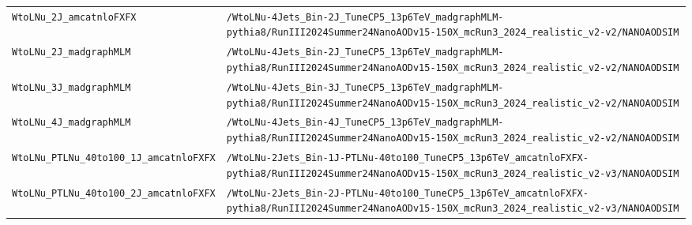 \begin{longtable}{@{}>{\RaggedRight\arraybackslash}p{} >{\RaggedRight\arraybackslash}p{}@{}}
\addlinespace[2pt]
\texttt{WtoLNu\_\allowbreak{}2J\_\allowbreak{}amcatnloFXFX} & \texttt{/\allowbreak{}WtoLNu-\allowbreak{}4Jets\_\allowbreak{}Bin-\allowbreak{}2J\_\allowbreak{}TuneCP5\_\allowbreak{}13p6TeV\_\allowbreak{}madgraphMLM-\allowbreak{}pythia8/\allowbreak{}RunIII2024Summer24NanoAODv15-\allowbreak{}150X\_\allowbreak{}mcRun3\_\allowbreak{}2024\_\allowbreak{}realistic\_\allowbreak{}v2-\allowbreak{}v2/\allowbreak{}NANOAODSIM} \\
\addlinespace[2pt]
\texttt{WtoLNu\_\allowbreak{}2J\_\allowbreak{}madgraphMLM} & \texttt{/\allowbreak{}WtoLNu-\allowbreak{}4Jets\_\allowbreak{}Bin-\allowbreak{}2J\_\allowbreak{}TuneCP5\_\allowbreak{}13p6TeV\_\allowbreak{}madgraphMLM-\allowbreak{}pythia8/\allowbreak{}RunIII2024Summer24NanoAODv15-\allowbreak{}150X\_\allowbreak{}mcRun3\_\allowbreak{}2024\_\allowbreak{}realistic\_\allowbreak{}v2-\allowbreak{}v2/\allowbreak{}NANOAODSIM} \\
\addlinespace[2pt]
\texttt{WtoLNu\_\allowbreak{}3J\_\allowbreak{}madgraphMLM} & \texttt{/\allowbreak{}WtoLNu-\allowbreak{}4Jets\_\allowbreak{}Bin-\allowbreak{}3J\_\allowbreak{}TuneCP5\_\allowbreak{}13p6TeV\_\allowbreak{}madgraphMLM-\allowbreak{}pythia8/\allowbreak{}RunIII2024Summer24NanoAODv15-\allowbreak{}150X\_\allowbreak{}mcRun3\_\allowbreak{}2024\_\allowbreak{}realistic\_\allowbreak{}v2-\allowbreak{}v2/\allowbreak{}NANOAODSIM} \\
\addlinespace[2pt]
\texttt{WtoLNu\_\allowbreak{}4J\_\allowbreak{}madgraphMLM} & \texttt{/\allowbreak{}WtoLNu-\allowbreak{}4Jets\_\allowbreak{}Bin-\allowbreak{}4J\_\allowbreak{}TuneCP5\_\allowbreak{}13p6TeV\_\allowbreak{}madgraphMLM-\allowbreak{}pythia8/\allowbreak{}RunIII2024Summer24NanoAODv15-\allowbreak{}150X\_\allowbreak{}mcRun3\_\allowbreak{}2024\_\allowbreak{}realistic\_\allowbreak{}v2-\allowbreak{}v2/\allowbreak{}NANOAODSIM} \\
\addlinespace[2pt]
\texttt{WtoLNu\_\allowbreak{}PTLNu\_\allowbreak{}40to100\_\allowbreak{}1J\_\allowbreak{}amcatnloFXFX} & \texttt{/\allowbreak{}WtoLNu-\allowbreak{}2Jets\_\allowbreak{}Bin-\allowbreak{}1J-\allowbreak{}PTLNu-\allowbreak{}40to100\_\allowbreak{}TuneCP5\_\allowbreak{}13p6TeV\_\allowbreak{}amcatnloFXFX-\allowbreak{}pythia8/\allowbreak{}RunIII2024Summer24NanoAODv15-\allowbreak{}150X\_\allowbreak{}mcRun3\_\allowbreak{}2024\_\allowbreak{}realistic\_\allowbreak{}v2-\allowbreak{}v3/\allowbreak{}NANOAODSIM} \\
\addlinespace[2pt]
\texttt{WtoLNu\_\allowbreak{}PTLNu\_\allowbreak{}40to100\_\allowbreak{}2J\_\allowbreak{}amcatnloFXFX} & \texttt{/\allowbreak{}WtoLNu-\allowbreak{}2Jets\_\allowbreak{}Bin-\allowbreak{}2J-\allowbreak{}PTLNu-\allowbreak{}40to100\_\allowbreak{}TuneCP5\_\allowbreak{}13p6TeV\_\allowbreak{}amcatnloFXFX-\allowbreak{}pythia8/\allowbreak{}RunIII2024Summer24NanoAODv15-\allowbreak{}150X\_\allowbreak{}mcRun3\_\allowbreak{}2024\_\allowbreak{}realistic\_\allowbreak{}v2-\allowbreak{}v3/\allowbreak{}NANOAODSIM} \\

\end{longtable}
